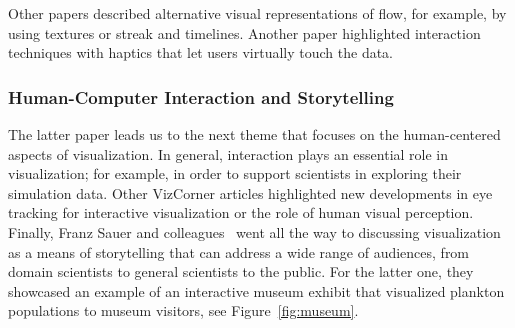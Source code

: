 \documentclass[10pt,journal,compsoc]{IEEEtran}
\begin{document}
Other papers described alternative visual representations of flow, for example, by using textures or streak and timelines. Another paper highlighted interaction techniques with haptics that let users virtually touch the data.

\subsubsection{Human-Computer Interaction and Storytelling}


The latter paper leads us to the next theme that focuses on the human-centered aspects of visualization. In general, interaction plays an essential role in visualization; for example, in order to support scientists in exploring their simulation data. Other VizCorner articles highlighted new developments in eye tracking for interactive visualization or the role of human visual perception. Finally, Franz Sauer and colleagues~\cite{Sauer2016} went all the way to discussing visualization as a means of storytelling that can address a wide range of audiences, from domain scientists to general scientists to the public. For the latter one, they showcased an example of an interactive museum exhibit that visualized plankton populations to museum visitors, see Figure~\ref{fig:museum}.
\end{document}
